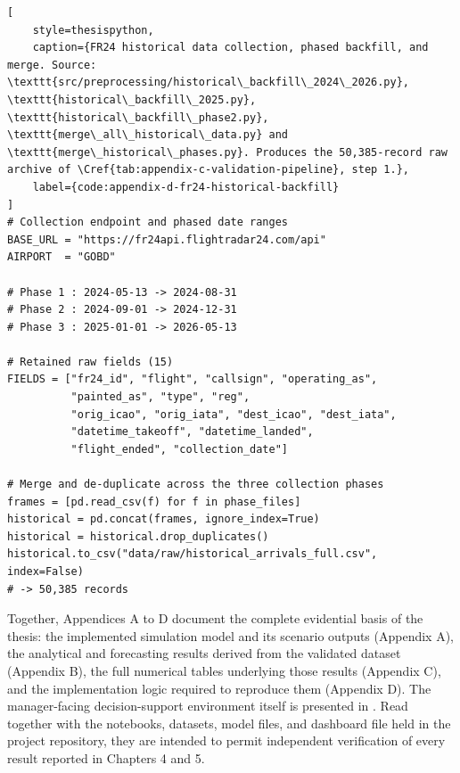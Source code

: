 \begin{lstlisting}[
    style=thesispython,
    caption={FR24 historical data collection, phased backfill, and merge. Source: \texttt{src/preprocessing/historical\_backfill\_2024\_2026.py}, \texttt{historical\_backfill\_2025.py}, \texttt{historical\_backfill\_phase2.py}, \texttt{merge\_all\_historical\_data.py} and \texttt{merge\_historical\_phases.py}. Produces the 50,385-record raw archive of \Cref{tab:appendix-c-validation-pipeline}, step 1.},
    label={code:appendix-d-fr24-historical-backfill}
]
# Collection endpoint and phased date ranges
BASE_URL = "https://fr24api.flightradar24.com/api"
AIRPORT  = "GOBD"

# Phase 1 : 2024-05-13 -> 2024-08-31
# Phase 2 : 2024-09-01 -> 2024-12-31
# Phase 3 : 2025-01-01 -> 2026-05-13

# Retained raw fields (15)
FIELDS = ["fr24_id", "flight", "callsign", "operating_as",
          "painted_as", "type", "reg",
          "orig_icao", "orig_iata", "dest_icao", "dest_iata",
          "datetime_takeoff", "datetime_landed",
          "flight_ended", "collection_date"]

# Merge and de-duplicate across the three collection phases
frames = [pd.read_csv(f) for f in phase_files]
historical = pd.concat(frames, ignore_index=True)
historical = historical.drop_duplicates()
historical.to_csv("data/raw/historical_arrivals_full.csv", index=False)
# -> 50,385 records
\end{lstlisting}

Together, Appendices A to D document the complete evidential basis of the thesis: the implemented simulation model and its scenario outputs (Appendix A), the analytical and forecasting results derived from the validated dataset (Appendix B), the full numerical tables underlying those results (Appendix C), and the implementation logic required to reproduce them (Appendix D). The manager-facing decision-support environment itself is presented in . Read together with the notebooks, datasets, model files, and dashboard file held in the project repository, they are intended to permit independent verification of every result reported in Chapters 4 and 5.